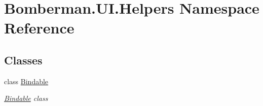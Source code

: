 \hypertarget{namespace_bomberman_1_1_u_i_1_1_helpers}{}\section{Bomberman.\+U\+I.\+Helpers Namespace Reference}
\label{namespace_bomberman_1_1_u_i_1_1_helpers}
\subsection*{Classes}
\begin{DoxyCompactItemize}
\item 
class \mbox{\hyperlink{class_bomberman_1_1_u_i_1_1_helpers_1_1_bindable}{Bindable}}
\begin{DoxyCompactList}\small\item\em \mbox{\hyperlink{class_bomberman_1_1_u_i_1_1_helpers_1_1_bindable}{Bindable}} class \end{DoxyCompactList}\end{DoxyCompactItemize}
